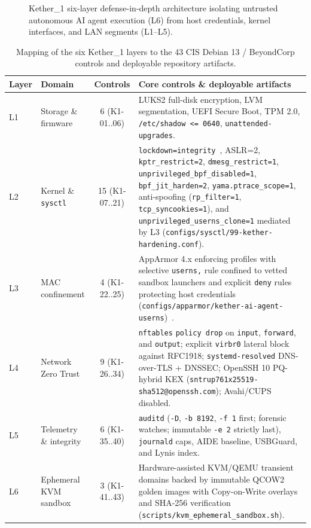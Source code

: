 \documentclass[11pt,a4paper]{article}
\newcommand{\code}[1]{\nolinkurl{#1}}
\begin{document}
\begin{figure}[htbp]
\caption{Kether\_1 six-layer defense-in-depth architecture isolating untrusted autonomous AI agent execution (L6) from host credentials, kernel interfaces, and LAN segments (L1--L5).}
\label{fig:arch}
\end{figure}

\begin{table}[htbp]
\centering
\caption{Mapping of the six Kether\_1 layers to the 43 CIS Debian 13 / BeyondCorp controls and deployable repository artifacts.}
\label{tab:layers}
\footnotesize
\renewcommand{\arraystretch}{1.2}
\begin{tabularx}{\textwidth}{@{}l p{2.3cm} c L@{}}
\toprule
\textbf{Layer} & \textbf{Domain} & \textbf{Controls} & \textbf{Core controls \& deployable artifacts} \\
\midrule
L1 & Storage \& firmware & 6 (K1-01..06) & LUKS2 full-disk encryption, LVM segmentation, UEFI Secure Boot, TPM 2.0, \code{/etc/shadow <= 0640}, \code{unattended-upgrades}. \\
L2 & Kernel \& \code{sysctl} & 15 (K1-07..21) & \code{lockdown=integrity}~\cite{linuxlockdown}, ASLR=2, \code{kptr_restrict=2}, \code{dmesg_restrict=1}, \code{unprivileged_bpf_disabled=1}, \code{bpf_jit_harden=2}, \code{yama.ptrace_scope=1}, anti-spoofing (\code{rp_filter=1}, \code{tcp_syncookies=1}), and \code{unprivileged_userns_clone=1} mediated by L3 (\code{configs/sysctl/99-kether-hardening.conf}). \\
L3 & MAC confinement & 4 (K1-22..25) & AppArmor 4.x enforcing profiles with selective \code{userns,} rule confined to vetted sandbox launchers and explicit \code{deny} rules protecting host credentials (\code{configs/apparmor/kether-ai-agent-userns})~\cite{apparmor4}. \\
L4 & Network Zero Trust & 9 (K1-26..34) & \code{nftables} \code{policy drop} on \code{input}, \code{forward}, and \code{output}; explicit \code{virbr0} lateral block against RFC1918; \code{systemd-resolved} DNS-over-TLS + DNSSEC; OpenSSH 10 PQ-hybrid KEX (\code{sntrup761x25519-sha512@openssh.com}); Avahi/CUPS disabled. \\
L5 & Telemetry \& integrity & 6 (K1-35..40) & \code{auditd} (\code{-D}, \code{-b 8192}, \code{-f 1} first; forensic watches; immutable \code{-e 2} strictly last), \code{journald} caps, AIDE baseline, USBGuard, and Lynis index. \\
L6 & Ephemeral KVM sandbox & 3 (K1-41..43) & Hardware-assisted KVM/QEMU transient domains backed by immutable QCOW2 golden images with Copy-on-Write overlays~\cite{qemuqcow2} and SHA-256 verification (\code{scripts/kvm_ephemeral_sandbox.sh}). \\
\bottomrule
\end{tabularx}
\end{table}
\end{document}
